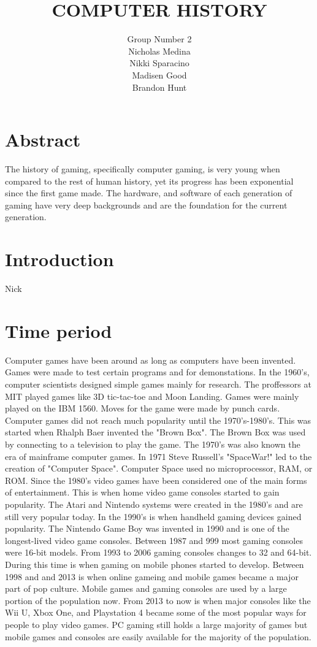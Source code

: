 \documentclass[letterpaper, 10 pt, conference]{IEEEconf}
\title{\LARGE \bf
COMPUTER HISTORY\\
\large
}
\author{Group Number 2\\
\small Nicholas Medina\\
\small Nikki Sparacino\\
\small Madisen Good\\
\small Brandon Hunt\\
}
\begin{document}
\maketitle 

\section{Abstract}

The history of gaming, specifically computer gaming, is very young when compared
to the rest of human history, yet its progress has been exponential since the first
game made. The hardware, and software of each generation of gaming have very deep
backgrounds and are the foundation for the current generation.

\section{Introduction}
Nick
\section{Time period}
Computer games have been around as long as computers have been invented. Games were made to test certain programs and for demonstations. In the 1960's, computer scientists designed simple games mainly for research. The proffessors at MIT played games like 3D tic-tac-toe and Moon Landing. Games were mainly played on the IBM 1560. Moves for the game were made by punch cards. Computer games did not reach much popularity until the 1970's-1980's. This was started when Rhalph Baer invented the "Brown Box". The Brown Box was used by connecting to a television to play the game. The 1970's was also known the era of mainframe computer games. In 1971 Steve Russell's "SpaceWar!" led to the creation of "Computer Space". Computer Space used no microprocessor, RAM, or ROM. Since the 1980's video games have been considered one of the main forms of entertainment. This is when home video game consoles started to gain popularity. The Atari and Nintendo systems were created in the 1980's and are still very popular today. In the 1990's is when handheld gaming devices gained popularity. The Nintendo Game Boy was invented in 1990 and is one of the longest-lived video game consoles. Between 1987 and 999 most gaming consoles were 16-bit models. From 1993 to 2006 gaming consoles changes to 32 and 64-bit. During this time is when gaming on mobile phones started to develop. Between 1998 and and 2013 is when online gameing and mobile games became a major part of pop culture. Mobile games and gaming consoles are used by a large portion of the population now. From 2013 to now is when major consoles like the Wii U, Xbox One, and Playstation 4 became some of the most popular ways for people to play video games. PC gaming still holds a large majority of games but mobile games and consoles are easily available for the majority of the population.
\end{document}

